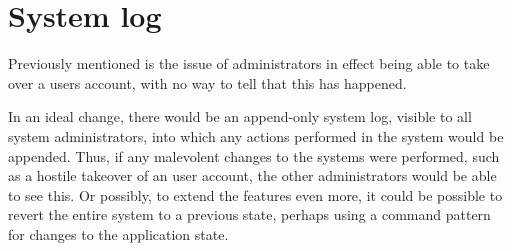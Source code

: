 \documentclass[../../master.tex]{subfiles}
\begin{document}
\section{System log}
Previously mentioned is the issue of administrators in effect being able to take over a users account, with no way to tell that this has happened.

In an ideal change, there would be an append-only system log, visible to all system administrators, into which any actions performed in the system would be appended.
Thus, if any malevolent changes to the systems were performed, such as a hostile takeover of an user account, the other administrators would be able to see this.
Or possibly, to extend the features even more, it could be possible to revert the entire system to a previous state, perhaps using a command pattern for changes to the application state.
\end{document}
